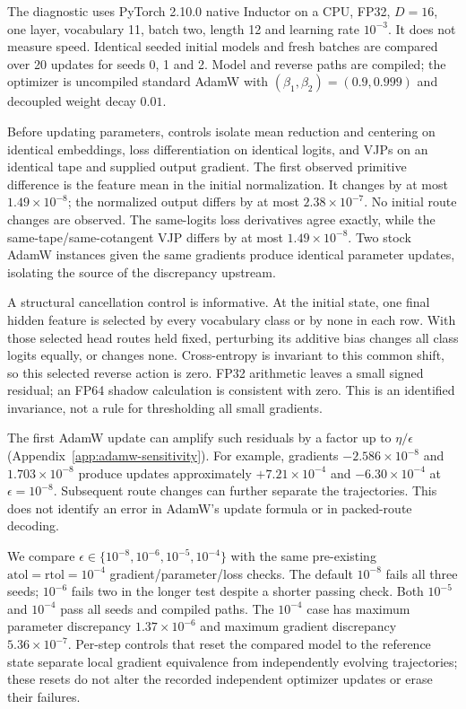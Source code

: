 The diagnostic uses PyTorch 2.10.0 native Inductor on a CPU, FP32,
$D=16$, one layer, vocabulary 11, batch two, length 12 and learning rate
$10^{-3}$. It does not measure speed. Identical seeded initial models and
fresh batches are compared over 20 updates for seeds 0, 1 and 2. Model and
reverse paths are compiled; the optimizer is uncompiled standard AdamW
with $(\beta_1,\beta_2)=(0.9,0.999)$ and decoupled weight decay $0.01$.

Before updating parameters, controls isolate mean reduction and centering
on identical embeddings, loss differentiation on identical logits, and
VJPs on an identical tape and supplied output gradient. The first observed
primitive difference is the feature mean in the initial normalization.
It changes by at most $1.49\times10^{-8}$; the normalized output differs
by at most $2.38\times10^{-7}$. No initial route changes are observed.
The same-logits loss derivatives agree exactly, while the
same-tape/same-cotangent VJP differs by at most $1.49\times10^{-8}$.
Two stock AdamW instances given the same gradients produce identical
parameter updates, isolating the source of the discrepancy upstream.

A structural cancellation control is informative. At the initial state,
one final hidden feature is selected by every vocabulary class or by none
in each row. With those selected head routes held fixed, perturbing its
additive bias changes all class
logits equally, or changes none. Cross-entropy is invariant to this
common shift, so this selected reverse action is zero. FP32 arithmetic
leaves a small signed residual; an FP64 shadow calculation is consistent
with zero. This is an identified invariance, not a rule for thresholding
all small gradients.

The first AdamW update can amplify such residuals by a factor up to
$\eta/\epsilon$ (Appendix~\ref{app:adamw-sensitivity}). For example,
gradients $-2.586\times10^{-8}$ and $1.703\times10^{-8}$ produce updates
approximately $+7.21\times10^{-4}$ and $-6.30\times10^{-4}$ at
$\epsilon=10^{-8}$. Subsequent route changes can further separate the
trajectories. This does not identify an error in AdamW's update formula
or in packed-route decoding.

We compare $\epsilon\in\{10^{-8},10^{-6},10^{-5},10^{-4}\}$ with the same
pre-existing $\mathrm{atol}=\mathrm{rtol}=10^{-4}$ gradient/parameter/loss
checks. The default $10^{-8}$ fails all three seeds; $10^{-6}$ fails two
in the longer test despite a shorter passing check. Both $10^{-5}$ and
$10^{-4}$ pass all seeds and compiled paths. The $10^{-4}$ case has maximum
parameter discrepancy $1.37\times10^{-6}$ and maximum gradient discrepancy
$5.36\times10^{-7}$. Per-step controls that reset the compared model to
the reference state separate local gradient equivalence from independently
evolving trajectories; these resets do not alter the recorded independent
optimizer updates or erase their failures.

